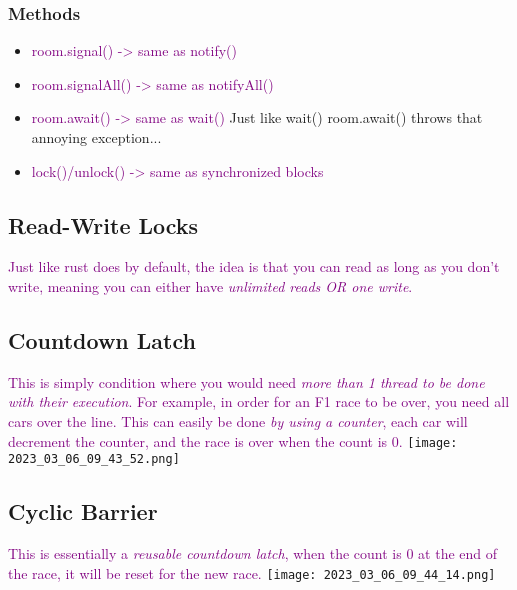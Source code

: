\documentclass[main.tex,fontsize=8pt,paper=a4,paper=portrait,DIV=calc,]{scrartcl}
\begin{document}
\subsubsection{Methods}
\begin{itemize}
\item \textcolor{purple}{room.signal() -> same as notify()}
\item \textcolor{purple}{room.signalAll() -> same as notifyAll()}
\item \textcolor{purple}{room.await() -> same as wait()}\newline
  Just like wait() room.await() throws that annoying exception...
\item \textcolor{purple}{lock()/unlock() -> same as synchronized blocks}
\end{itemize} 

\subsection{Read-Write Locks}
\textcolor{purple}{Just like rust does by default, the idea is that you can read as long as you don't write, meaning you can either have \emph{unlimited reads OR one write}.}

\subsection{Countdown Latch}
\textcolor{purple}{This is simply condition where you would need \emph{more than 1 thread to be done with their execution}. \newline
For example, in order for an F1 race to be over, you need all cars over the line. This can easily be done \emph{by using a counter}, each car will decrement the counter, and the race is over when the count is 0.}\newline
\texttt{[image: 2023\_03\_06\_09\_43\_52.png]}

\subsection{Cyclic Barrier}
\textcolor{purple}{This is essentially a \emph{reusable countdown latch}, when the count is 0 at the end of the race, it will be reset for the new race.}\newline
\texttt{[image: 2023\_03\_06\_09\_44\_14.png]}
\end{document}
